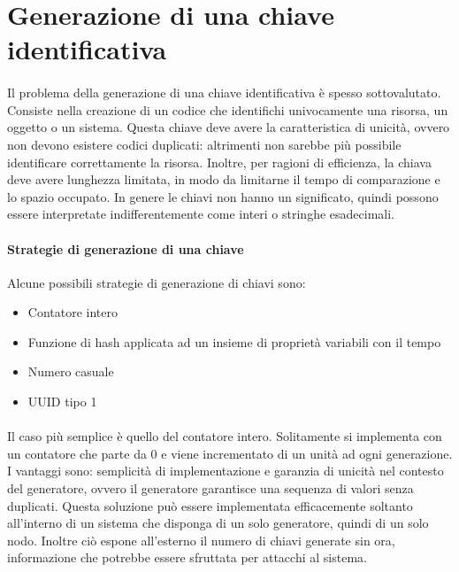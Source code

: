 \documentclass{article}
\begin{document}
\section{Generazione di una chiave identificativa}

\paragraph{} Il problema della generazione di una chiave identificativa è spesso sottovalutato. Consiste nella creazione di un codice che identifichi univocamente una risorsa, un oggetto o un sistema. Questa chiave deve avere la caratteristica di unicità, ovvero non devono esistere codici duplicati: altrimenti non sarebbe più possibile identificare correttamente la risorsa. Inoltre, per ragioni di efficienza, la chiava deve avere lunghezza limitata, in modo da limitarne il tempo di comparazione e lo spazio occupato. In genere le chiavi non hanno un significato, quindi possono essere interpretate indifferentemente come interi o stringhe esadecimali.  

\paragraph{Strategie di generazione di una chiave} Alcune possibili strategie di generazione di chiavi sono: \begin{itemize}
	\item Contatore intero
	\item Funzione di hash applicata ad un insieme di proprietà variabili con il tempo
	\item Numero casuale
	\item UUID tipo 1
\end{itemize}

\paragraph{} Il caso più semplice è quello del contatore intero. Solitamente si implementa con un contatore che parte da 0 e viene incrementato di un unità ad ogni generazione. I vantaggi sono: semplicità di implementazione e garanzia di unicità nel contesto del generatore, ovvero il generatore garantisce una sequenza di valori senza duplicati. Questa soluzione può essere implementata efficacemente soltanto all'interno di un sistema che disponga di un solo generatore, quindi di un solo nodo. Inoltre ciò espone all'esterno il numero di chiavi generate sin ora, informazione che potrebbe essere sfruttata per attacchi al sistema. 
\end{document}
